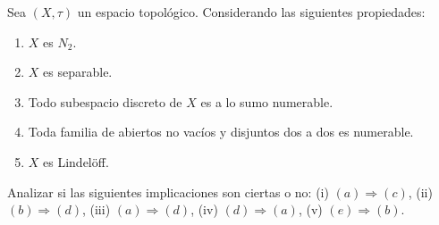 \documentclass{article}
\theoremstyle{definition}
\newenvironment{ejercicio}[1]{\begin{trivlist}
\item[\hskip \labelsep {\bfseries Ejercicio}\hskip \labelsep {\bfseries #1.}]}{\end{trivlist}}
\begin{document}
\begin{ejercicio}{9}
    Sea \((X, \tau)\) un espacio topológico. Considerando las siguientes propiedades:
    \begin{enumerate}
        \item \(X\) es \(N_{2}\).
        \item \(X\) es separable.
        \item Todo subespacio discreto de \(X\) es a lo sumo numerable.
        \item Toda familia de abiertos no vacíos y disjuntos dos a dos es numerable.
        \item \(X\) es Lindelöff.
    \end{enumerate}
    Analizar si las siguientes implicaciones son ciertas o no:
    (i) \((a)\Rightarrow(c)\), (ii) \((b)\Rightarrow(d)\), (iii) \((a)\Rightarrow(d)\), (iv) \((d)\Rightarrow(a)\), (v) \((e)\Rightarrow(b)\).
\end{ejercicio}
\end{document}
